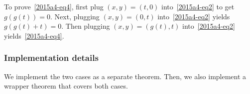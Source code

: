 \documentclass{article}
\begin{document}
To prove~\eqref{2015a4-eq4}, first plug $(x, y) = (t, 0)$ into~\eqref{2015a4-eq2} to get $g(g(t)) = 0$.
Next, plugging $(x, y) = (0, t)$ into~\eqref{2015a4-eq2} yields $g(g(t) + t) = 0$.
Then plugging $(x, y) = (g(t), t)$ into~\eqref{2015a4-eq2} yields~\eqref{2015a4-eq4}.



\subsubsection*{Implementation details}

We implement the two cases as a separate theorem.
Then, we also implement a wrapper theorem that covers both cases.
\end{document}
